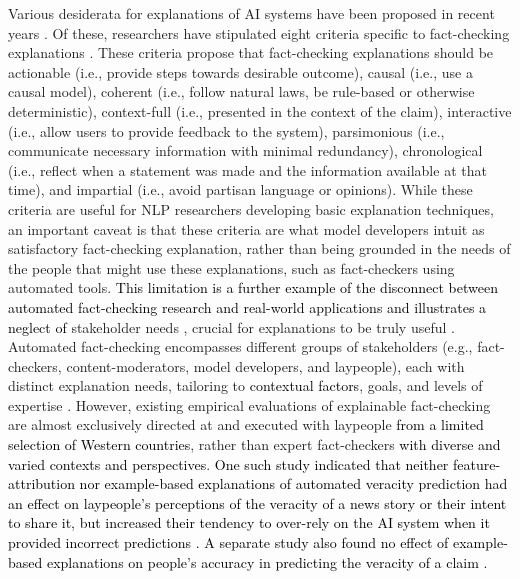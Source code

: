 Various desiderata for explanations of AI systems have been proposed in recent years \cite{sokol2020explassessment,langer2021we,nauta2023xaireview}. Of these, researchers have stipulated eight criteria specific to fact-checking explanations \cite{kotonya2020explainablesurvey}. 
These criteria propose that fact-checking explanations should be actionable (i.e., provide steps towards desirable outcome), causal (i.e., use a causal model), coherent (i.e., follow natural laws, be rule-based or otherwise deterministic), context-full (i.e., presented in the context of the claim), interactive (i.e., allow users to provide feedback to the system), parsimonious (i.e., communicate necessary information with minimal redundancy), chronological (i.e., reflect when a statement was made and the information available at that time), and impartial (i.e., avoid partisan language or opinions).
While these criteria are useful for NLP researchers developing basic explanation techniques, an important caveat is that these criteria are what model developers intuit as satisfactory fact-checking explanation, rather than being grounded in the needs of the people that might use these explanations, such as fact-checkers using automated tools.
\textcolor{black}{This limitation is a further example of the disconnect between automated fact-checking research and real-world applications and illustrates a neglect of} stakeholder needs \cite{schlichtkrull2023usesfactchecking}, crucial for explanations to be truly useful \cite{liao2022humancenteredexplainableaixai,langer2021we}.
Automated fact-checking encompasses different groups of stakeholders (e.g., fact-checkers, content-moderators, model developers, and laypeople), each with distinct explanation needs, tailoring to \textcolor{black}{contextual factors}, goals, and levels of expertise \cite{langer2021we,juneja2022human,liao2022humancenteredexplainableaixai,ehsan2024thewho}.
However, existing empirical evaluations of explainable fact-checking are almost exclusively directed at and executed with laypeople \textcolor{black}{from a limited selection of Western countries}, rather than expert fact-checkers \textcolor{black}{with diverse and varied contexts and perspectives}.
\textcolor{black}{One such study indicated that neither feature-attribution nor example-based explanations of automated veracity prediction had an effect on laypeople's perceptions of the veracity of a news story or their intent to share it, but increased their tendency to over-rely on the AI system when it provided incorrect predictions \cite{lim2023xai}. A separate study also found no effect of example-based explanations on people's accuracy in predicting the veracity of a claim \cite{linder2021level}.}

